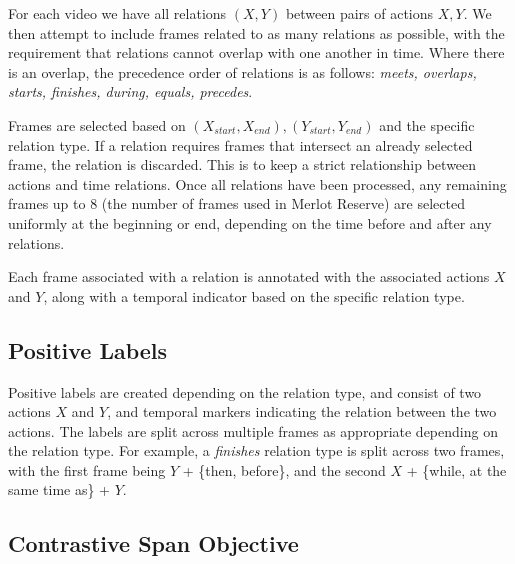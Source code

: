 For each video we have all relations $(X, Y)$ between pairs of actions $X, Y$.
We then attempt to include frames related to as many relations as possible,
with the requirement that relations cannot overlap with one another in time.
Where there is an overlap, the precedence order of relations is as follows: \textit{meets,
overlaps, starts, finishes, during, equals, precedes}. %

Frames are selected based on $(X_{start}, X_{end}), (Y_{start}, Y_{end})$ and
the specific relation type. If a relation requires frames that intersect an
already selected frame, the relation is discarded. This is to keep a strict
relationship between actions and time relations. Once all relations have been
processed, any remaining frames up to 8 (the number of frames used in Merlot
Reserve) are selected uniformly at the beginning or end, depending on the time
before and after any relations. %

Each frame associated with a relation is annotated with the associated actions
$X$ and $Y$, along with a temporal indicator based on the specific relation
type. 


\subsection{Positive Labels}

Positive labels are created depending on the relation type, and consist of two
actions $X$ and $Y$, and temporal markers indicating the relation between the
two actions. The labels are split across multiple frames as appropriate
depending on the relation type. For example, a \textit{finishes} relation type
is split across two frames, with the first frame being $Y$ + \{then, before\},
and the second $X$ + \{while, at the same time as\} + $Y$. 

\subsection{Contrastive Span Objective}

